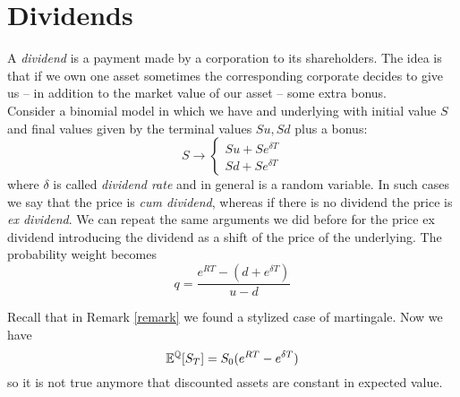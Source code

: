 \section{Dividends}
A \emph{dividend} is a payment made by a corporation to its shareholders. The idea is that if we own one asset sometimes the corresponding corporate decides to give us -- in addition to the market value of our asset -- some extra bonus. \\
Consider a binomial model in which we have and underlying with initial value $S$ and final values given by the terminal values $Su,Sd$ plus a bonus:
\begin{equation}
    S \to \begin{cases} 
    Su + Se^{\delta T} \\ Sd + Se^{\delta T} 
    \end{cases}
\end{equation}
where $\delta$ is called \emph{dividend rate} and in general is a random variable. In such cases we say that the price is \emph{cum dividend}, whereas if there is no dividend the price is \emph{ex dividend}. We can repeat the same arguments we did before for the price ex dividend introducing the dividend as a shift of the price of the underlying. The probability weight becomes
\begin{equation}
    q = \dfrac{e^{RT}-(d+e^{\delta T})}{u-d}
\end{equation}
\begin{remark}
    Recall that in Remark \ref{remark} we found a stylized case of martingale. Now we have 
    \begin{equation}
        \mathbb{E}^{\mathbb{Q}}[S_T] = S_0(e^{RT}-e^{\delta T})
    \end{equation}
    so it is not true anymore that discounted assets are constant in expected value.
\end{remark}


